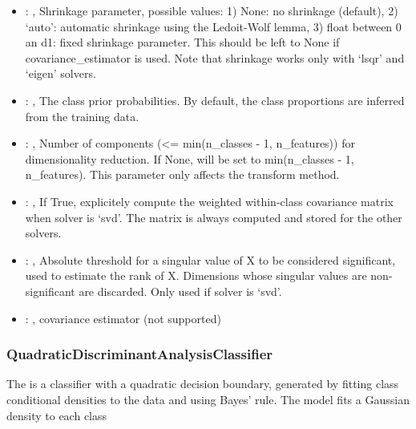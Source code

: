 \begin{itemize}
    \item {}: ,
      Shrinkage parameter, possible values: 1) None: no shrinkage (default),
      2) `auto': automatic shrinkage using the Ledoit-Wolf lemma,
      3) float between 0 an d1: fixed shrinkage parameter.
      This should be left to None if covariance\_estimator is used. Note that shrinkage works
      only with `lsqr' and `eigen' solvers.

    \item {}: ,
      The class prior probabilities. By default, the class proportions are inferred from the
      training data.

    \item {}: ,
      Number of components (<= min(n\_classes - 1, n\_features)) for dimensionality reduction.
      If None, will be set to min(n\_classes - 1, n\_features). This parameter only affects the
      transform                                                  method.

    \item {}: ,
      If True, explicitely compute the weighted within-class covariance matrix when solver
      is `svd'. The matrix is always computed and stored for the other solvers.

    \item {}: ,
      Absolute threshold for a singular value of X to be considered significant, used to estimate
      the rank of X.                                                  Dimensions whose singular
      values are non-significant are discarded. Only used if solver is `svd'.

    \item {}: ,
      covariance estimator (not supported)
  \end{itemize}


\subsubsection{QuadraticDiscriminantAnalysisClassifier}
  The  is a classifier with a quadratic decision
  boundary,     generated by fitting class conditional densities to the data and using Bayes' rule.
  The model fits a Gaussian density to each class

